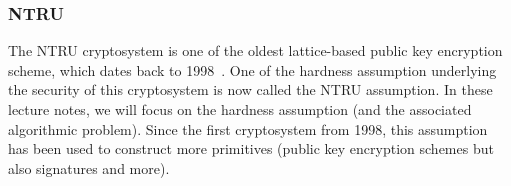 




\subsubsection{NTRU}
\label{sec:NTRU}
The NTRU cryptosystem is one of the oldest lattice-based public key encryption scheme, which dates back to 1998~\cite{NTRU}. One of the hardness assumption underlying the security of this cryptosystem is now called the NTRU assumption. In these lecture notes, we will focus on the hardness assumption (and the associated algorithmic problem). Since the first cryptosystem from 1998, this assumption has been used to construct more primitives (public key encryption schemes but also signatures and more). 

